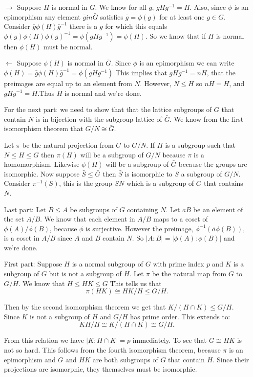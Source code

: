 \documentclass[12pt]{report}
\begin{document}
$\rightarrow$ Suppose $H$ is normal in $G$. We know for all $g$, $gHg^{-1} = H$.
Also, since $\phi$ is an epimorphism any element $\bar{g} in \bar{G}$ satisfies
$\bar{g} = \phi(g)$ for at least one $g \in G$. Consider $\bar{g}\phi(H)\bar{g}
^{-1}$ there is a $g$ for which this equals $\phi(g)\phi(H)\phi(g)^{-1} =
\phi(gHg^{-1}) = \phi(H)$. So we know that if $H$ is normal then $\phi(H)$ must
be normal.

$\leftarrow$ Suppose $\phi(H)$ is normal in $\bar{G}$. Since $\phi$ is an
epimorphism we can write $\phi(H) = \bar{g}\phi(H)\bar{g}^{-1} = \phi(gHg^{-1})$
This implies that $gHg^{-1} = nH$, that the preimages are equal up to an element
from $N$. However, $N \leq H$ so $nH = H$, and $gHg^{-1} = H$.Thus $H$ is normal
and we're done.

For the next part: we need to show that that the lattice subgroups of $G$ that
contain $N$ is in bijection with the subgroup lattice of $\bar{G}$. We know from
the first isomorphism theorem that $G/N \cong \bar{G}$.

Let $\pi$ be the natural projection from $G$ to $G/N$. If $H$ is a subgroup such
that $N \leq H \leq G$ then $\pi(H)$ will be a subgroup of $G/N$ because $\pi$
is a homomorphism. Likewise $\phi(H)$ will be a subgroup of $\bar{G}$ because
the groups are isomorphic. Now suppose $\bar{S} \leq \bar{G}$ then $\bar{S}$ is
isomorphic to $S$ a subgroup of $G/N$. Consider $\pi^{-1}(S)$, this is the group
$SN$ which is a subgroup of $G$ that contains $N$.

Last part: Let $B \leq A$ be subgroups of $G$ containing $N$. Let $aB$ be an
element of the set $A/B$. We know that each element in $A/B$ maps to a coset of
$\phi(A)/\phi(B)$, because $\phi$ is surjective. However the preimage, $\phi^
{-1}(\bar{a}\phi(B))$, is a coset in $A/B$ since $A$ and $B$ contain $N$. So
$|A:B| = |\phi(A):\phi(B)|$ and we're done.


First part: Suppose $H$ is a normal subgroup of $G$ with prime index $p$ and $K$
is a subgroup of $G$ but is not a subgroup of $H$. Let $\pi$ be the natural map
from $G$ to $G/H$. We know that $H \leq HK \leq G$ This tells us that
$$\pi(HK) \cong HK/H \leq G/H.$$

Then by the second isomorphism theorem we get that $K/(H \cap K) \leq G/H$.
Since $K$ is not a subgroup of $H$ and $G/H$ has prime order. This extends to:
$$KH/H \cong K/(H\cap K) \cong G/H.$$

From this relation we have $|K : H \cap K| = p$ immediately. To see that $G
\cong HK$ is not so hard. This follows from the fourth isomorphism theorem,
because $\pi$ is an epimorphism and $G$ and $HK$ are both subgroups of $G$ that
contain $H$. Since their projections are isomorphic, they themselves must be
isomorphic.
\end{document}
